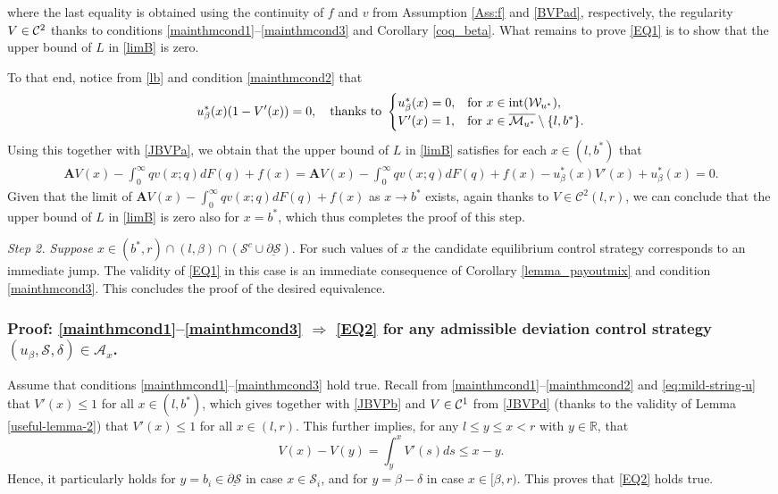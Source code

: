 \documentclass[11pt]{article} %
\numberwithin{komcounter}{section}
\renewcommand{\ul}{\underline}
\begin{document}
where the last equality is obtained using the continuity of $f$ and $v$ from Assumption \ref{Ass:f} and \eqref{BVPad}, respectively, 
the regularity $V \in {\cal C}^2$ thanks to conditions \eqref{mainthmcond1}--\eqref{mainthmcond3} and Corollary \ref{coq_beta}. 
What remains to prove \eqref{EQ1} is to show that the upper bound of $L$ in \eqref{limB} is zero.

To that end, notice from \eqref{lb} and condition \eqref{mainthmcond2} that 
$$
u_\beta^*(x)(1 - V'(x))=0, \quad 
\text{thanks to } \begin{cases}
u_\beta^*(x)=0, &\text{for } x \in {\rm int}({\mathcal{W}}_{u^*}), \\
V'(x)=1, &\text{for } x \in \overline{\mathcal{M}_{u^*}} \setminus \{l,b^*\} .
\end{cases}
$$
Using this together with \eqref{JBVPa}, we obtain that the upper bound of $L$ in \eqref{limB} satisfies for each $x\in (l,b^*)$ that    
\begin{align} \label{limB=0}
\mathbf{A} V(x) - \textstyle{\int_{0}^{\infty}} q v(x;q) dF(q) + f(x) 
= \mathbf{A} V(x) - \textstyle{\int_{0}^{\infty}} q v(x;q) dF(q) + f(x) - u^*_\beta(x) V'(x) + u^*_\beta(x) 
= 0.
\end{align}
Given that the limit of $\mathbf{A} V(x) - \textstyle{\int_{0}^{\infty}} q v(x;q) dF(q) + f(x)$ as $x \to b^*$ exists, again thanks to $V\in\mathcal{C}^2(l,r)$, we can conclude that the upper bound of $L$ in \eqref{limB} is zero also for $x=b^*$, 
which thus completes the proof of this step.

\vspace{1mm}
{\it Step 2. Suppose $x\in (b^*,r) \cap (l,\beta) \cap (\mathcal{S}^c \cup  \ul{\partial \mathcal{S}})$}.
For such values of $x$ the candidate equilibrium control strategy corresponds to an immediate jump. 
The validity of \eqref{EQ1} in this case is an immediate consequence of Corollary \ref{lemma_payoutmix} and condition \eqref{mainthmcond3}. 
This concludes the proof of the desired equivalence.



\subsubsection{Proof: \eqref{mainthmcond1}--\eqref{mainthmcond3} $\Rightarrow$ \eqref{EQ2} for any admissible deviation control strategy $(u_\beta, \mathcal{S}, \delta)\in \mathcal{A}_{x}$.}

Assume that conditions \eqref{mainthmcond1}--\eqref{mainthmcond3} hold true. 
Recall from \eqref{mainthmcond1}--\eqref{mainthmcond2} and \eqref{eq:mild-string-u} that $V'(x)\leq 1$ for all $x\in (l,b^*)$, which gives together with \eqref{JBVPb} and $V \in {\cal C}^1$ from \eqref{JBVPd} (thanks to the validity of Lemma \ref{useful-lemma-2}) that $V'(x)\leq 1$ for all $x\in (l,r)$.
This further implies, for any $l \leq y \leq x < r$ with $y\in \mathbb{R}$, that
$$
V(x) - V(y) = \int_y^x V'(s) ds \leq x - y .
$$
Hence, it particularly holds for $y=b_i \in \ul{\partial \mathcal{S}}$ in case $x \in \mathcal{S}_i$, and for $y=\beta-\delta$ in case $x \in [\beta,r)$.
This proves that \eqref{EQ2} holds true. 
\end{document}
